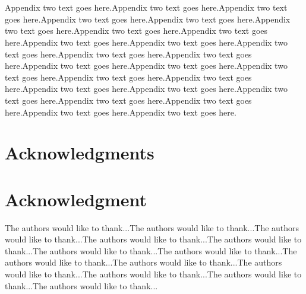 \documentclass[10pt,journal,cspaper,compsoc]{IEEEtran}
\begin{document}
\section{}
Appendix two text goes here.Appendix two text goes here.Appendix two text goes here.Appendix two text goes here.Appendix two text goes here.Appendix two text goes here.Appendix two text goes here.Appendix two text goes here.Appendix two text goes here.Appendix two text goes here.Appendix two text goes here.Appendix two text goes here.Appendix two text goes here.Appendix two text goes here.Appendix two text goes here.Appendix two text goes here.Appendix two text goes here.Appendix two text goes here.Appendix two text goes here.Appendix two text goes here.Appendix two text goes here.Appendix two text goes here.Appendix two text goes here.Appendix two text goes here.Appendix two text goes here.


\ifCLASSOPTIONcompsoc
  \section*{Acknowledgments}
\else
  \section*{Acknowledgment}
\fi


The authors would like to thank...The authors would like to thank...The authors would like to thank...The authors would like to thank...The authors would like to thank...The authors would like to thank...The authors would like to thank...The authors would like to thank...The authors would like to thank...The authors would like to thank...The authors would like to thank...The authors would like to thank...The authors would like to thank...


\ifCLASSOPTIONcaptionsoff
  \newpage
\fi





\end{document}

